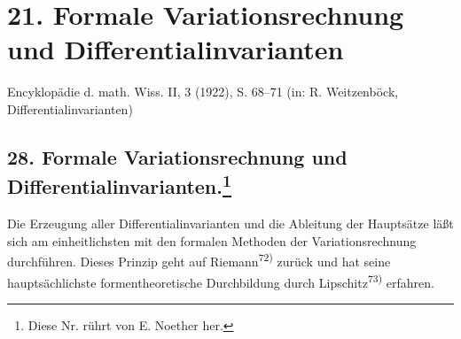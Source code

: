 \documentclass[11pt]{article}
\begin{document}
\clearpage
\section*{21. Formale Variationsrechnung und Differentialinvarianten}
\begin{center}
Encyklopädie d. math. Wiss. II, 3 (1922), S. 68--71 (in: R. Weitzenböck, Differentialinvarianten)
\end{center}

\setcounter{footnote}{148}
\subsection*{28. Formale Variationsrechnung und Differentialinvarianten.\footnote{Diese Nr. rührt von E. Noether her.}}

Die Erzeugung aller Differentialinvarianten und die Ableitung der Hauptsätze läßt sich am einheitlichsten mit den formalen Methoden der Variationsrechnung durchführen. Dieses Prinzip geht auf Riemann\textsuperscript{72)} zurück und hat seine hauptsächlichste formentheoretische Durchbildung durch Lipschitz\textsuperscript{73)} erfahren.
\end{document}
